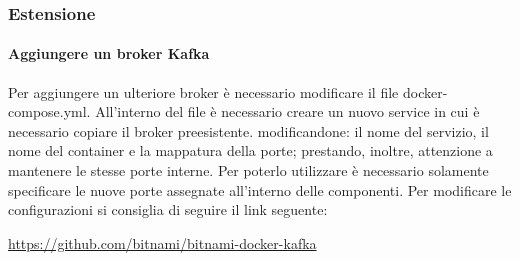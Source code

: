 	\subsubsection{Estensione}
		\paragraph{Aggiungere un broker Kafka}
		Per aggiungere un ulteriore broker è necessario modificare il file docker-compose.yml.
		\newline
		All'interno del file è necessario creare un nuovo service in cui è necessario copiare il broker preesistente. modificandone: il nome del servizio, il nome del container e la mappatura della porte; prestando, inoltre, attenzione a mantenere le stesse porte interne.
		\newline
		Per poterlo utilizzare è necessario solamente specificare le nuove porte assegnate all'interno delle componenti.
		\newline
		Per modificare le configurazioni si consiglia di seguire il link seguente:
		\begin{center}
			\url{https://github.com/bitnami/bitnami-docker-kafka}
		\end{center}
			   
	